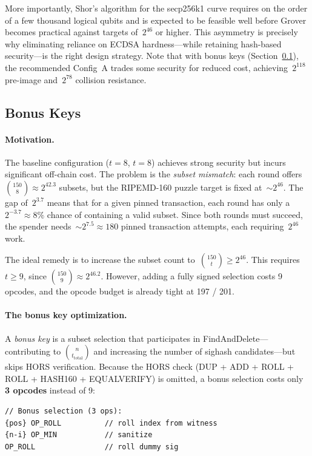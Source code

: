 \documentclass[11pt, a4paper]{article}
\begin{document}
More importantly, Shor's algorithm for the secp256k1 curve requires on the order of a few thousand logical qubits and is expected to be feasible well before Grover becomes practical against targets of~$2^{46}$ or higher. This asymmetry is precisely why eliminating reliance on ECDSA hardness---while retaining hash-based security---is the right design strategy. Note that with bonus keys (Section~\ref{sec:bonus-keys}), the recommended Config~A trades some security for reduced cost, achieving~$2^{118}$ pre-image and~$2^{78}$ collision resistance.

\subsection{Bonus Keys}
\label{sec:bonus-keys}

\paragraph{Motivation.}
The baseline configuration ($t = 8$, $t = 8$) achieves strong security but incurs significant off-chain cost. The problem is the \emph{subset mismatch}: each round offers $\binom{150}{8} \approx 2^{42.3}$ subsets, but the RIPEMD-160 puzzle target is fixed at~${\sim}2^{46}$. The gap of~$2^{3.7}$ means that for a given pinned transaction, each round has only a~$2^{-3.7} \approx 8\%$ chance of containing a valid subset. Since both rounds must succeed, the spender needs~${\sim}2^{7.5} \approx 180$ pinned transaction attempts, each requiring~$2^{46}$ work.

The ideal remedy is to increase the subset count to~$\binom{150}{t} \geq 2^{46}$. This requires $t \geq 9$, since $\binom{150}{9} \approx 2^{46.2}$. However, adding a fully signed selection costs 9 opcodes, and the opcode budget is already tight at 197 / 201.

\paragraph{The bonus key optimization.}
A \emph{bonus key} is a subset selection that participates in FindAndDelete---contributing to $\binom{n}{t_{\mathrm{total}}}$ and increasing the number of sighash candidates---but skips HORS verification. Because the HORS check (DUP + ADD + ROLL + ROLL + HASH160 + EQUALVERIFY) is omitted, a bonus selection costs only \textbf{3 opcodes} instead of 9:

\begin{lstlisting}[language={}, numbers=none]
// Bonus selection (3 ops):
{pos} OP_ROLL          // roll index from witness
{n-i} OP_MIN           // sanitize
OP_ROLL                // roll dummy sig
\end{lstlisting}
\end{document}
